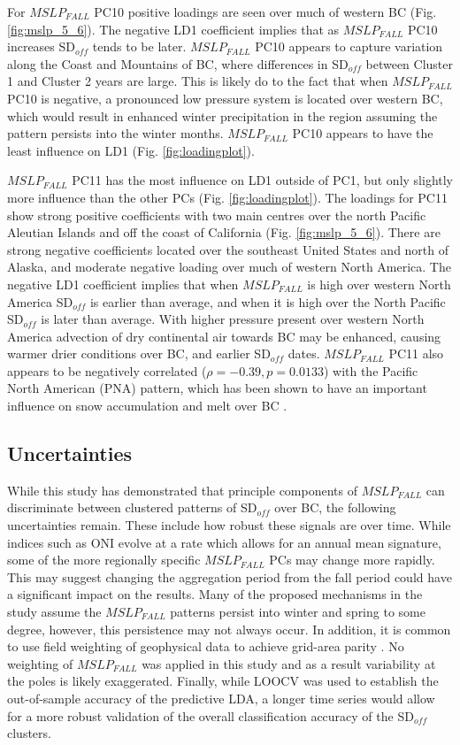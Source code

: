 \documentclass{tATO2e}
\newcommand{\sdoff}{SD$_{off}$}
\begin{document}
\par
For $MSLP_{FALL}$ PC10 positive loadings are seen over much of western BC (Fig. \ref{fig:mslp_5_6}). The negative LD1 coefficient implies that as $MSLP_{FALL}$ PC10 increases \sdoff{} tends to be later. $MSLP_{FALL}$ PC10 appears to capture variation along the Coast and Mountains of BC, where differences in \sdoff{} between Cluster 1 and Cluster 2 years are large. This is likely do to the fact that when $MSLP_{FALL}$ PC10 is negative, a pronounced low pressure system is located over western BC, which would result in enhanced winter precipitation in the region assuming the pattern persists into the winter months. $MSLP_{FALL}$ PC10 appears to have the least influence on LD1 (Fig. \ref{fig:loadingplot}). 
\par
$MSLP_{FALL}$ PC11 has the most influence on LD1 outside of PC1, but only slightly more influence than the other PCs (Fig. \ref{fig:loadingplot}). The loadings for PC11 show strong positive coefficients with two main centres over the north Pacific Aleutian Islands and off the coast of California (Fig. \ref{fig:mslp_5_6}). There are strong negative coefficients located over the southeast United States and north of Alaska, and moderate negative loading over much of western North America. The negative LD1 coefficient implies that when $MSLP_{FALL}$ is high over western North America \sdoff{} is earlier than average, and when it is high over the North Pacific \sdoff{} is later than average. With higher pressure present over western North America advection of dry continental air towards BC may be enhanced, causing warmer drier conditions over BC, and earlier \sdoff{} dates. $MSLP_{FALL}$ PC11 also appears to be negatively correlated ($\rho = -0.39, p = 0.0133$) with the Pacific North American (PNA) pattern, which has been shown to have an important influence on snow accumulation and melt over BC \citep{Moore1996-xr}.

\subsection{Uncertainties}
While this study has demonstrated that principle components of $MSLP_{FALL}$ can discriminate between clustered patterns of \sdoff{} over BC, the following uncertainties remain. These include how robust these signals are over time. While indices such as ONI evolve at a rate which allows for an annual mean signature, some of the more regionally specific $MSLP_{FALL}$ PCs may change more rapidly. This may suggest changing the aggregation period from the fall period could have a significant impact on the results. Many of the proposed  mechanisms in the study assume the $MSLP_{FALL}$ patterns persist into winter and spring to some degree, however, this persistence may not always occur. In addition, it is common to use field weighting of geophysical data to achieve grid-area parity \citep{Chung1999}. No weighting of $MSLP_{FALL}$ was applied in this study and as a result variability at the poles is likely exaggerated. Finally, while LOOCV was used to establish the out-of-sample accuracy of the predictive LDA, a longer time series would allow for a more robust validation of the overall classification accuracy of the \sdoff{} clusters.
\end{document}
